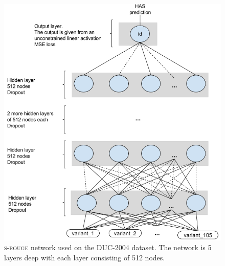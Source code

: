 \documentclass[11pt,a4paper]{article}
\newcommand{\duc}{\textsc{DUC-2004}\xspace}
\begin{document}
\begin{figure}[ht]
{
\centering
\includegraphics[scale=0.35]{../../my_diagrams/DUC_dataset/DUC_s-rouge.png}
\caption{\textsc{s-rouge} network used on the \duc dataset. The network is 5 layers deep with each layer consisting of 512 nodes.}
\label{fig:duc-srouge}
}
\end{figure}
\end{document}
